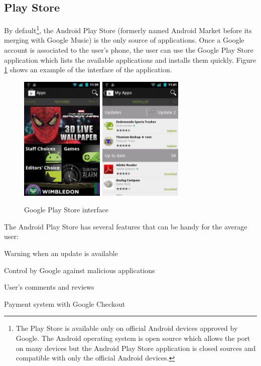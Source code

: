 \subsection{Play Store}
By default\footnote{The Play Store is available only on official Android devices approved by Google. The Android operating system is open source which allows the port on many devices but the Android Play Store application is closed sources and compatible with only the official Android devices.}, the Android Play Store (formerly named Android Market before its merging with Google Music) is the only source of applications.
Once a Google account is associated to the user's phone, the user can use the Google Play Store application which lists the available applications and installs them quickly.
Figure \ref{fig:market} shows an example of the interface of the application.\\

\begin{figure}[h]
  \centering
  \includegraphics[width=4cm]{images/market1.png}
  \includegraphics[width=4cm]{images/market2.png}
  \caption{Google Play Store interface}
  \label{fig:market}
\end{figure}

The Android Play Store has several features that can be handy for the average user:
\begin{itemizealt}
\item Warning when an update is available
\item Control by Google against malicious applications
\item User's comments and reviews
\item Payment system with Google Checkout
\end{itemizealt}

